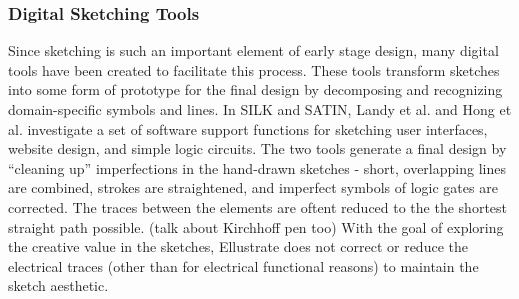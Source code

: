 \documentclass{sigchi}
\begin{document}



\subsubsection{Digital Sketching Tools} 
Since sketching is such an important element of early stage design, many digital tools have been created to facilitate this process. These tools transform sketches into some form of prototype for the final design by decomposing and recognizing domain-specific symbols and lines. In SILK and SATIN, Landy et al. and Hong et al. investigate a set of software support functions for sketching user interfaces, website design, and simple logic circuits. The two tools generate a final design by ``cleaning up'' imperfections in the hand-drawn sketches - short, overlapping lines are combined, strokes are straightened, and imperfect symbols of logic gates are corrected. The traces between the elements are oftent reduced to the the shortest straight path possible. (talk about Kirchhoff pen too) With the goal of exploring the creative value in the sketches, Ellustrate does not correct or reduce the electrical traces (other than for electrical functional reasons) to maintain the sketch aesthetic. 
\end{document}
